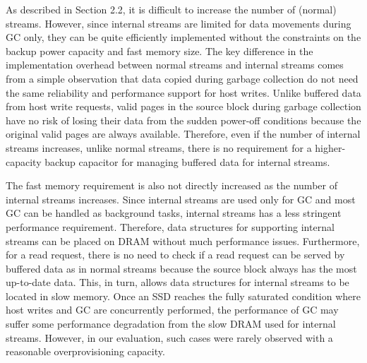 {\color{blue}
As described in Section 2.2, it is difficult to increase the number of 
(normal) streams.  However, since internal streams are limited for 
data movements during GC only, they can be quite efficiently
implemented without the constraints on the backup power capacity and fast memory size.  
The key difference in the implementation overhead between normal streams and 
internal streams comes from a simple observation that data copied during 
garbage collection do not need the same reliability and performance support for host writes.  
Unlike buffered data from host write requests, valid pages in
the source block during garbage collection have no risk of losing their data 
from the sudden power-off conditions because the original valid pages are always available.    
Therefore, even if the
number of internal streams increases, unlike normal streams, there is no requirement 
for a higher-capacity backup capacitor for managing buffered data for internal streams. 

The fast memory requirement is also not directly increased as the number 
of internal streams increases.   
Since internal streams are used only for GC and most GC can be handled as background tasks,
internal streams has a less stringent performance requirement.  
Therefore, data structures for supporting internal streams can be placed 
on DRAM without much performance issues.  
Furthermore, for a read request, there is no need to check if a read request 
can be served by buffered data as in normal streams because the source block always 
has the most up-to-date data.  
This, in turn, allows data structures for internal streams to be located in slow memory.
Once an SSD reaches the fully saturated condition where host writes and GC 
are concurrently performed, the performance of GC may suffer some performance degradation 
from the slow DRAM used for internal streams.   
However, in our evaluation, such cases were rarely observed with a reasonable overprovisioning capacity.
}

